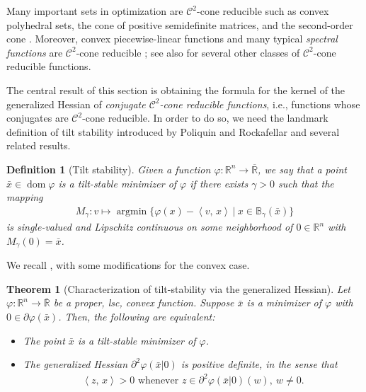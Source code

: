 \documentclass[reqno]{amsart}
\newtheorem{theorem}[proposition]{Theorem}
\newtheorem{definition}[proposition]{Definition}
\numberwithin{equation}{section}
\newcommand{\R}{\mathbb{R}}
\newcommand{\x}{\bar{x}}
\newcommand{\argmin}{\operatorname{argmin}}
\newcommand{\ip}[2]{\left\langle #1,\, #2\right\rangle}
\begin{document}
Many important sets in optimization are $\mathcal{C}^2$-cone reducible such as convex polyhedral sets, the cone of positive semidefinite matrices, and the second-order cone   \cite{BS 00, Sh03,BR05}. Moreover,   convex piecewise-linear functions and many typical {\em spectral functions} are $\mathcal{C}^2$-cone reducible \cite{BS 00,CDZ17}; see also \cite[Remark~2]{CHNS 26} for several other classes of $\mathcal{C}^2$-cone reducible functions.



The central result of this section is obtaining the formula for the kernel of the generalized Hessian of {\em conjugate $\mathcal{C}^2$-cone reducible functions}, i.e., functions whose conjugates are $\mathcal C^2$-cone reducible. In order to do so, we need the landmark definition of tilt stability \cite{PR 98} introduced by Poliquin and Rockafellar and several related results.

\begin{definition}[Tilt stability]
 Given a function $\varphi : \R^n \to \overline{\R}$, we say that a point $\x \in \operatorname{dom} \varphi$
    is a \emph{tilt-stable minimizer} of $\varphi$ if there exists $\gamma > 0$ such that the mapping
    \begin{align*}
        M_{\gamma} : v \mapsto \argmin \{\varphi(x) -  \ip{v}{x} \ | \ x \in \mathbb{B}_{\gamma}(\x)\}
    \end{align*}
is single-valued and Lipschitz continuous on some neighborhood of $0\in \R^n$ with $M_\gamma(0)=\x$.
\end{definition}





\noindent
We recall \cite[Theorem 1.3]{PR 98}, with some modifications for the convex case.

\begin{theorem}[Characterization of tilt-stability via the generalized Hessian]\label{thm:tiltstab}
    Let $\varphi:\R^n \to \overline{\R}$ be a proper, lsc, convex function. Suppose $\bar{x}$ is a minimizer of $\varphi$ with $0 \in \partial \varphi (\bar{x})$.
    Then, the following are equivalent:
    \begin{itemize}
        \item[(i)] The point $\bar{x}$ is a tilt-stable minimizer of $\varphi$.
        \item[(ii)] The generalized Hessian $\partial^2 \varphi (\bar{x} | 0)$ is positive definite, in the sense that
        \begin{align}\label{eq:PHes}
          \ip{z}{x}  > 0 \text{ whenever } z \in \partial^2 \varphi(\bar{x} | 0)(w), \ w \not = 0.
        \end{align}
    \end{itemize}
\end{theorem}
\end{document}
